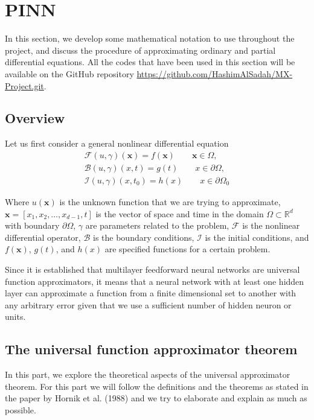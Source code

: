 \documentclass[a4paper,12pt]{article}
\theoremstyle{definition}
\begin{document}
\section{PINN}
In this section, we develop some mathematical notation to use throughout the project, 
and discuss the procedure of approximating ordinary and partial differential equations. All the 
codes that have been used in this section will be available on the GitHub repository 
\url{https://github.com/HashimAlSadah/MX-Project.git}.

\subsection{Overview}\label{pinn overview}
Let us first consider a general nonlinear differential equation
\begin{equation}\label{general_PDE}
\begin{aligned}
\mathcal{F}(u, \gamma)(\mathbf{x}) = f(\mathbf{x}) \qquad \mathbf{x} \in  \Omega,\\
\mathcal{B}(u, \gamma)(x, t) = g(t) \qquad x \in \partial{\Omega}, \\
\mathcal{I}(u, \gamma)(x, t_0) = h(x) \qquad x \in \partial{\Omega_0}
\end{aligned}
\end{equation}

Where $u(\mathbf{x})$ is the unknown function that we are trying to approximate, 
$\mathbf{x} = [ x_1, x_2, \dots, x_{d-1}, t]$ is the vector of space and time 
in the domain $\Omega \subset \mathbb{R}^d$  with boundary $\partial{\Omega}$, 
$\gamma$ are parameters related to the problem, $\mathcal{F}$ is the nonlinear 
differential operator, $\mathcal{B}$ is the boundary conditions, $\mathcal{I}$ is 
the initial conditions, and $f(\mathbf{x})$, $g(t)$, and $h(x)$ are specified 
functions for a certain problem. 

Since it is established that multilayer feedforward neural networks 
are universal function approximators\cite{hornik1989multilayer}, it means that 
a neural network with at least one hidden layer can approximate a function 
from a finite dimensional set to another with 
any arbitrary error given that we use a sufficient number of hidden neuron or units.

\subsection{The universal function approximator theorem}
In this part, we explore the theoretical aspects of the universal approximator theorem.
For this part we will follow the definitions and the theorems as stated in the paper 
by Hornik et al. (1988) and we try to elaborate and explain as much as possible. 
\end{document}
